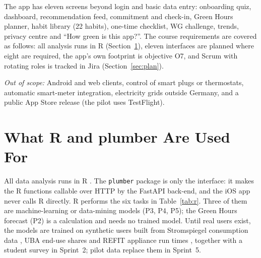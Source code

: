 \documentclass[10pt,twocolumn,letterpaper]{article}
\newcommand{\code}[1]{\texttt{#1}}
\begin{document}
The app has eleven screens beyond login and basic data entry: onboarding quiz, dashboard, recommendation feed, commitment and check-in, Green Hours planner, habit library (22 habits), one-time checklist, WG challenge, trends, privacy centre and ``How green is this app?''. The course requirements are covered as follows: all analysis runs in R (Section~\ref{sec:r}), eleven interfaces are planned where eight are required, the app's own footprint is objective O7, and Scrum with rotating roles is tracked in Jira (Section~\ref{sec:plan}).
 
\textit{Out of scope:} Android and web clients, control of smart plugs or thermostats, automatic smart-meter integration, electricity grids outside Germany, and a public App Store release (the pilot uses TestFlight).
 
\section{What R and plumber Are Used For}\label{sec:r}
All data analysis runs in R \cite{rcore}. The \code{plumber} package \cite{plumber} is only the interface: it makes the R functions callable over HTTP by the FastAPI back-end, and the iOS app never calls R directly. R performs the six tasks in Table~\ref{tab:r}. Three of them are machine-learning or data-mining models (P3, P4, P5); the Green Hours forecast (P2) is a calculation and needs no trained model. Until real users exist, the models are trained on synthetic users built from Stromspiegel consumption data \cite{stromspiegel}, UBA end-use shares \cite{uba_hh} and REFIT appliance run times \cite{refit}, together with a student survey in Sprint~2; pilot data replace them in Sprint~5.
 
\end{document}
